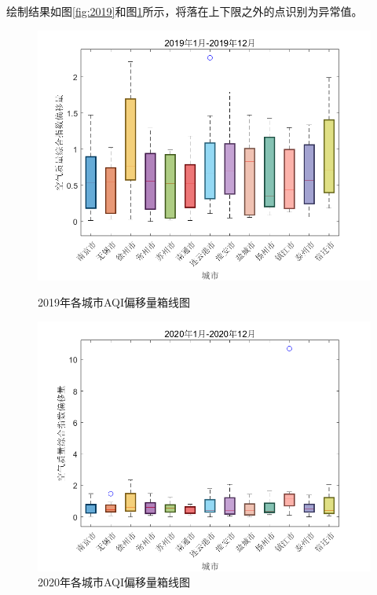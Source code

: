 \documentclass[a4paper,12pt]{article}
\begin{document}
	绘制结果如图\ref{fig:2019}和图\ref{fig:2020}所示，将落在上下限之外的点识别为异常值。
	\begin{figure}[h]
		\centering
		\begin{minipage}{0.48\textwidth}
			\centering
			\includegraphics[width=\linewidth]{2019箱线图.png}
			\caption{2019年各城市AQI偏移量箱线图}
			\label{fig:2019}
		\end{minipage}\hfill
		\begin{minipage}{0.48\textwidth}
			\centering
			\includegraphics[width=\linewidth]{2020箱线图.png}
			\caption{2020年各城市AQI偏移量箱线图}
			\label{fig:2020}
		\end{minipage}
	\end{figure}
	
\end{document}
